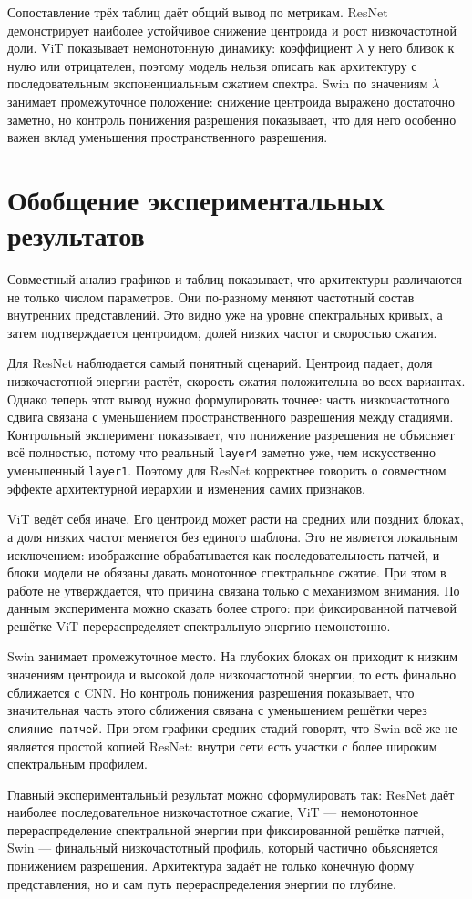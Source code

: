 Сопоставление трёх таблиц даёт общий вывод по метрикам. ResNet демонстрирует наиболее устойчивое снижение центроида и рост низкочастотной доли. ViT показывает немонотонную динамику: коэффициент $\lambda$ у него близок к нулю или отрицателен, поэтому модель нельзя описать как архитектуру с последовательным экспоненциальным сжатием спектра. Swin по значениям $\lambda$ занимает промежуточное положение: снижение центроида выражено достаточно заметно, но контроль понижения разрешения показывает, что для него особенно важен вклад уменьшения пространственного разрешения.

\section{Обобщение экспериментальных результатов}

Совместный анализ графиков и таблиц показывает, что архитектуры различаются не только числом параметров. Они по-разному меняют частотный состав внутренних представлений. Это видно уже на уровне спектральных кривых, а затем подтверждается центроидом, долей низких частот и скоростью сжатия.

Для ResNet наблюдается самый понятный сценарий. Центроид падает, доля низкочастотной энергии растёт, скорость сжатия положительна во всех вариантах. Однако теперь этот вывод нужно формулировать точнее: часть низкочастотного сдвига связана с уменьшением пространственного разрешения между стадиями. Контрольный эксперимент показывает, что понижение разрешения не объясняет всё полностью, потому что реальный \texttt{layer4} заметно уже, чем искусственно уменьшенный \texttt{layer1}. Поэтому для ResNet корректнее говорить о совместном эффекте архитектурной иерархии и изменения самих признаков.

ViT ведёт себя иначе. Его центроид может расти на средних или поздних блоках, а доля низких частот меняется без единого шаблона. Это не является локальным исключением: изображение обрабатывается как последовательность патчей, и блоки модели не обязаны давать монотонное спектральное сжатие. При этом в работе не утверждается, что причина связана только с механизмом внимания. По данным эксперимента можно сказать более строго: при фиксированной патчевой решётке ViT перераспределяет спектральную энергию немонотонно.

Swin занимает промежуточное место. На глубоких блоках он приходит к низким значениям центроида и высокой доле низкочастотной энергии, то есть финально сближается с CNN. Но контроль понижения разрешения показывает, что значительная часть этого сближения связана с уменьшением решётки через \texttt{слияние патчей}. При этом графики средних стадий говорят, что Swin всё же не является простой копией ResNet: внутри сети есть участки с более широким спектральным профилем.

Главный экспериментальный результат можно сформулировать так: ResNet даёт наиболее последовательное низкочастотное сжатие, ViT — немонотонное перераспределение спектральной энергии при фиксированной решётке патчей, Swin — финальный низкочастотный профиль, который частично объясняется понижением разрешения. Архитектура задаёт не только конечную форму представления, но и сам путь перераспределения энергии по глубине.
